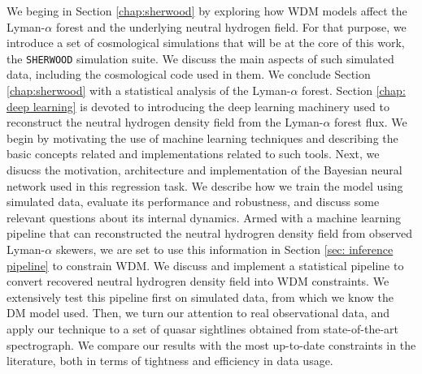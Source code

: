 We beging in Section \ref{chap:sherwood} by exploring how WDM models affect the Lyman-$\alpha$ forest and the underlying neutral hydrogen field. For that purpose, we introduce a set of cosmological simulations that will be at the core of this work, the \texttt{SHERWOOD} simulation suite. We discuss the main aspects of such simulated data, including the cosmological code used in them. We conclude Section \ref{chap:sherwood} with a statistical analysis of the Lyman-$\alpha$ forest. Section \ref{chap: deep learning} is devoted to introducing the deep learning machinery used to reconstruct the neutral hydrogen density field from the Lyman-$\alpha$ forest flux. We begin by motivating the use of machine learning techniques and describing the basic concepts related and implementations related to such tools. Next, we disucss the motivation, architecture and implementation of the Bayesian neural network used in this regression task. We describe how we train the model using simulated data, evaluate its performance and robustness, and discuss some relevant questions about its internal dynamics. Armed with a machine learning pipeline that can reconstructed the neutral hydrogren density field from observed Lyman-$\alpha$ skewers, we are set to use this information in Section \ref{sec: inference pipeline} to constrain WDM. We discuss and implement a statistical pipeline to convert recovered neutral hydrogren density field into WDM constraints. We extensively test this pipeline first on simulated data, from which we know the DM model used. Then, we turn our attention to real observational data, and apply our technique to a set of quasar sightlines obtained from state-of-the-art spectrograph. We compare our results with the most up-to-date constraints in the literature, both in terms of tightness and efficiency in data usage.
